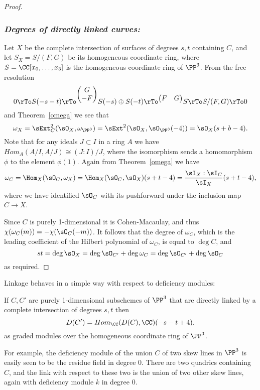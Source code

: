 \begin{proof}
\subsubsection{\it Degrees of directly linked curves:}
Let $X$ be the complete intersection of surfaces of degrees $s,t$ containing $C$, and let $S_X = S/(F,G)$ be its homogeneous coordinate ring, where
$S = \CC[x_0,\dots,x_3]$ is the homogeneous coordinate ring of $\PP^3$.
From the free resolution
$$
0\rTo S(-s-t) \rTo^{
\begin{pmatrix}
 G \\ -F
\end{pmatrix}}
 S(-s)\oplus S(-t) \rTo^{
\begin{pmatrix}
 F & G
\end{pmatrix}}
 S \rTo S/(F,G) \rTo 0
$$
 and Theorem~\ref{omega} we see that
 $$
\omega_X =  \sExt^2_C(\sO_X, \omega_{\PP^3}) =\sExt^2(\sO_X, \sO_{\PP^3}(-4)) = \sO_X(s+b-4).
 $$
Note that for any ideals $J\subset I$ in a ring $A$ we have $Hom_A(A/I, A/J) \cong (J:I)/J$, where the isomorphism
sends a homomorphism $\phi$ to the element $\phi(1)$. Again from Theorem~\ref{omega} we have 
$$
\omega_C = \Hom_X(\sO_C, \omega_X) = \Hom_X(\sO_C, \sO_X)(s+t-4) = \frac{\sI_X:\sI_C}{\sI_X}(s+t-4),
$$
where we have identified $\sO_C$ with its pushforward under the inclusion map $C\to X$. 

Since $C$ is purely 1-dimensional it is Cohen-Macaulay, and thus
$\chi(\omega_C(m)) = -\chi(\sO_C(-m))$. It follows that the degree of $\omega_C$, which is the leading coefficient of the Hilbert polynomial of $\omega_C$, is 
equal to $\deg C$, and 
$$
st = \deg \sO_X =\deg \sO_{C'}+\deg \omega_C = \deg \sO_{C'}+\deg \sO_C
$$
as required.
 \end{proof}

Linkage behaves in a simple way with respect to deficiency modules:

\begin{theorem}
If $C,C'$ are purely 1-dimensional subschemes of $\PP^3$ that are directly linked by a complete intersection of degrees $s,t$ then
$$
D(C') = Hom_\CC(D(C), \CC) (-s-t+4).
$$ 
as graded modules over the homogeneous coordinate ring of $\PP^3$.
\end{theorem}

For example, the deficiency module of the union $C$ of two skew lines in $\PP^3$ is easily seen to be the residue field in degree 0. There are
two quadrics containing $C$, and the link with respect to these two is the union of two other skew lines, again with deficiency module
$k$ in degree 0.


